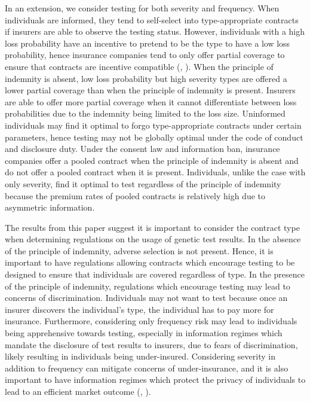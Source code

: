 \documentclass[natbib=false,preprint,12pt]{elsarticle}
\theoremstyle{plain}
\theoremstyle{definition}
\theoremstyle{plain}
\theoremstyle{TheoremNum}
\theoremstyle{CorollaryNum}
\theoremstyle{PropositionNum}
\theoremstyle{TheoremNum}
\begin{document}
In an extension, we consider testing for both severity and frequency. When individuals are informed, they tend to self-select into type-appropriate contracts if insurers are able to observe the testing status. However, individuals with a high loss probability have an incentive to pretend to be the type to have a low loss probability, hence insurance companies tend to only offer partial coverage to ensure that contracts are incentive compatible (\citeauthor{rothschild1978equilibrium}, \citeyear{rothschild1978equilibrium}). When the principle of indemnity is absent, low loss probability but high severity types are offered a lower partial coverage than when the principle of indemnity is present. Insurers are able to offer more partial coverage when it cannot differentiate between loss probabilities due to the indemnity being limited to the loss size. Uninformed individuals may find it optimal to forgo type-appropriate contracts under certain parameters, hence testing may not be globally optimal under the code of conduct and disclosure duty. Under the consent law and information ban, insurance companies offer a pooled contract when the principle of indemnity is absent and do not offer a pooled contract when it is present. Individuals, unlike the case with only severity, find it optimal to test regardless of the principle of indemnity because the premium rates of pooled contracts is relatively high due to asymmetric information. 

The results from this paper suggest it is important to consider the contract type when determining regulations on the usage of genetic test results. In the absence of the principle of indemnity, adverse selection is not present. Hence, it is important to have regulations allowing contracts which encourage testing to be designed to ensure that individuals are covered regardless of type. In the presence of the principle of indemnity, regulations which encourage testing may lead to concerns of discrimination. Individuals may not want to test because once an insurer discovers the individual's type, the individual has to pay more for insurance. Furthermore, considering only frequency risk may lead to individuals being apprehensive towards testing, especially in information regimes which mandate the disclosure of test results to insurers, due to fears of discrimination, likely resulting in individuals being under-insured. Considering severity in addition to frequency can mitigate concerns of under-insurance, and it is also important to have information regimes which protect the privacy of individuals to lead to an efficient market outcome (\citeauthor{rothschild2011efficiency}, \citeyear{rothschild2011efficiency}).
\end{document}
